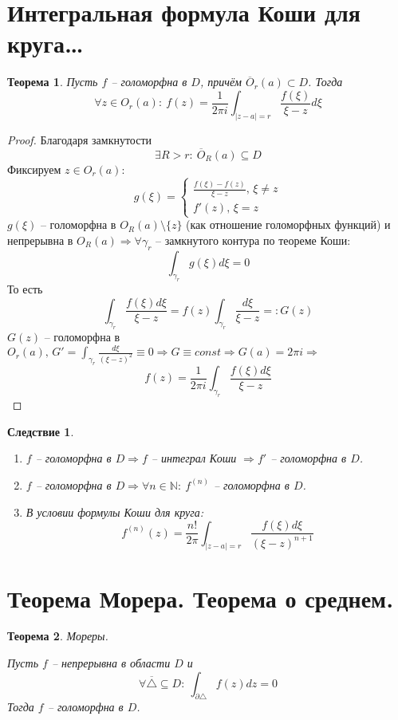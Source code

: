 \documentclass[a4paper,12pt]{article}
\theoremstyle{plain}
\newtheorem{theorem}{Теорема}[section]
\newtheorem*{corollary}{Следствие}
\theoremstyle{definition}
\theoremstyle{remark}
\begin{document}
\section{Интегральная формула Коши для круга\dots}
\begin{theorem}
	Пусть $f$ -- голоморфна в $D$, причём $\overline{O}_r(a) \subset D$. Тогда
	\[
		\forall z \in O_r(a) :\: f(z) = \frac{1}{2\pi i} \int_{\vert z - a\vert = r}\frac{f(\xi)}{\xi - z}d\xi
	\]
\end{theorem}

\begin{proof}
	Благодаря замкнутости
	\[
		\exists R > r :\: \overline{O}_R(a) \subseteq D
	\]
	Фиксируем $z \in O_r(a)$:
	\[
		g(\xi) = \begin{cases}
			\frac{f(\xi) - f(z)}{\xi - z},\, \xi \neq z \\
			f'(z),\, \xi = z
		\end{cases}
	\]
	$g(\xi)$ -- голоморфна в $O_R(a) \setminus \{z\}$ (как отношение голоморфных функций) и непрерывна в $O_R(a) \Rightarrow \forall \gamma_r$ -- замкнутого контура по теореме Коши:
	\[
		\int_{\gamma_r}g(\xi)d\xi = 0
	\]
	То есть
	\[
		\int_{\gamma_r}\frac{f(\xi)d\xi}{\xi - z} = f(z)\int_{\gamma_r}\frac{d\xi}{\xi - z} =: G(z)
	\]
	$G(z)$ -- голоморфна в $O_r(a),\, G' = \int_{\gamma_r} \frac{d\xi}{(\xi - z)^2} \equiv 0 \Rightarrow G \equiv const \Rightarrow G(a) = 2\pi i \Rightarrow$
	\[
		f(z) = \frac{1}{2\pi i} \int_{\gamma_r}\frac{f(\xi)d\xi}{\xi - z}
	\]
\end{proof}

\begin{corollary}
	\begin{enumerate}
		\item $f$ -- голоморфна в $D \Rightarrow f$ -- интеграл Коши $\Rightarrow f'$ -- голоморфна в $D$.
		\item $f$ -- голоморфна в $D \Rightarrow \forall n \in \mathbb{N} :\: f^{(n)}$ -- голоморфна в $D$.
		\item В условии формулы Коши для круга:
		      \begin{equation}\label{nElem}
			      f^{(n)}(z) = \frac{n!}{2\pi} \int_{\vert z - a\vert = r} \frac{f(\xi)d\xi}{(\xi - z)^{n + 1}}
		      \end{equation}
	\end{enumerate}
\end{corollary}

\section{Теорема Морера. Теорема о среднем.}
\begin{theorem}
	Мореры.

	Пусть $f$ -- непрерывна в области $D$ и
	\[
		\forall \overline{\triangle} \subseteq D :\: \int_{\partial \triangle} f(z)dz = 0
	\]
	Тогда $f$ -- голоморфна в $D$.
\end{theorem}
\end{document}
